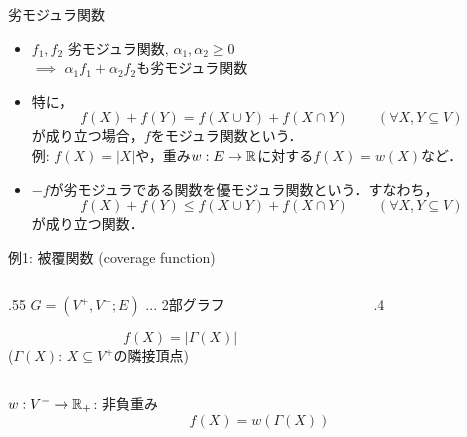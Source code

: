 \documentclass[14pt,aspectratio=169,xcolor=dvipsnames,table,onlytextwidth,dvipdfmx]{beamer}
\begin{document}
\begin{frame}{劣モジュラ関数}
    \begin{itemize}[<+->]
        \setlength{\itemsep}{1em}
        \item $f_1, f_2$ 劣モジュラ関数, $\alpha_1, \alpha_2 \geq 0$ \\
         $\implies$ $\alpha_1 f_1 + \alpha_2 f_2$も劣モジュラ関数

        \item 特に，
    \[
        f(X) + f(Y) = f(X \cup Y) + f(X \cap Y) \qquad (\forall X, Y \subseteq V)
    \]
    が成り立つ場合，$f$を\alert{モジュラ関数}という．\\
    {\footnotesize 例: $f(X) = |X|$や，重み$w: E \to \mathbb{R}$に対する$f(X) = w(X)$など．}


        \item $-f$が劣モジュラである関数を\alert{優モジュラ関数}という．すなわち，
    \[
        f(X) + f(Y) \leq f(X \cup Y) + f(X \cap Y) \qquad (\forall X, Y \subseteq V)
    \]
        が成り立つ関数．
    \end{itemize}
    
    \bigskip
\end{frame}



\begin{frame}{例1: 被覆関数 (coverage function)}
    \begin{columns}
        \begin{column}{.55\linewidth}
    $G = (V^+, V^-; E)$ ... 2部グラフ \\
    \begin{block}{}
    \[
        f(X) = |\Gamma(X)|
    \]
    {\small ($\Gamma(X)$: $X \subseteq V^+$の隣接頂点)}
    \end{block}
        \end{column}
        \begin{column}{.4\linewidth}
            \small
        \end{column}
    \end{columns}

    \vfill\pause
    \begin{block}{}
    $w: V^- \to \mathbb{R}_+$: 非負重み
    \[
        f(X) = w(\Gamma(X))
    \]
    \end{block}
\end{frame}
\end{document}
